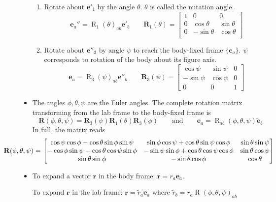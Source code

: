 \documentclass[11pt, a4paper]{article}
\newcommand{\eqtext}[1]{\qquad \text{#1} \qquad}
\newcommand{\e}{\mathbf{e}} %
\begin{document}
\begin{itemize}
\begin{enumerate}
		\item Rotate about $ \e'_{1} $ by the angle $ \theta $. $ \theta $ is called the nutation angle.
		\[
			\e_{a}'' = \operatorname{R}_{1}(\theta)_{ab} \e'_{b} \qquad \mathbf{R}_{1} (\theta) = 
			\begin{bmatrix}
				1 & 0 & 0\\
				0 & \cos \theta & \sin \theta\\
				0 & - \sin \theta & \cos \theta\\
			\end{bmatrix}
		\]

		\item Rotate about $ \e''_{3} $ by angle $ \psi $ to reach the body-fixed frame $ \{\e_{a} \} $. $ \psi $ corresponds to rotation of the body about its figure axis.
		\[
			\e_{a} = \operatorname{R}_{3}(\psi)_{ab} \e''_{b} \qquad \mathbf{R}_{3} (\psi) = 
			\begin{bmatrix}
				\cos \psi & \sin \psi & 0\\
				- \sin \psi & \cos \psi & 0\\
				0 & 0 & 1
			\end{bmatrix}
		\]
	\end{enumerate}
	
	\item The angles $ \phi, \theta, \psi $ are the Euler angles. The complete rotation matrix transforming from the lab frame to the body-fixed frame is
	\begin{equation*}
		\mathbf{R}(\phi, \theta, \psi) = \mathbf{R}_{3}(\psi) \mathbf{R}_{1} (\theta) \mathbf{R}_{3}(\phi) \eqtext{and} \e_{a} = \operatorname{R}_{ab}(\phi, \theta, \psi) \tilde{\e}_{b}
	\end{equation*}
	In full, the matrix reads
	\[
		\hspace{-15mm}\mathbf{R}(\phi, \theta, \psi) =
		\begin{bmatrix}
			\cos \psi \cos \phi - \cos \theta \sin \phi \sin \psi & \sin \phi \cos \psi + \cos \theta \sin \psi \cos \phi & \sin \theta \sin \psi\\
			- \cos \phi \sin \psi - \cos \theta \cos \psi \sin \phi & - \sin \psi \sin \phi + \cos \theta \cos \psi \cos \phi & \sin \theta \cos \psi \\
			\sin \theta \sin \phi & - \sin \theta \cos \phi & \cos \theta
		\end{bmatrix}
	\]
	
	\item To expand a vector $ \bm{r} $ in the body frame: $ \bm{r} = r_{a} \e_{a} $. 
	
	To expand $ \bm{r} $ in the lab frame: $ \bm{r} = \tilde{r}_{a} \tilde{\e}_{a}$ where $ \tilde{r}_{b} = r_{a}\operatorname{R}(\phi, \theta, \psi)_{ab} $
\end{itemize}
\end{document}

